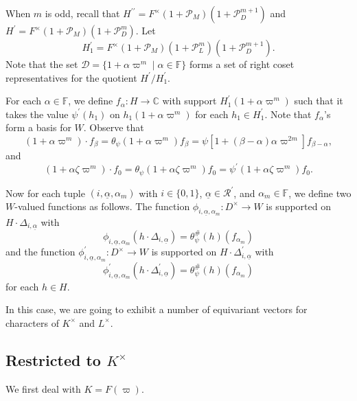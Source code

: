 \documentclass[12pt]{amsart}
\theoremstyle{definition}
\theoremstyle{remark}
\begin{document}
When $m$ is odd, recall that
$H^{\prime \prime} = F^\times (1 +\mathcal P_M) ( 1 + \mathcal P_D^{m+1})$ and $H^\prime = F^\times (1 +\mathcal P_M) ( 1 + \mathcal P_D^m)$. 
Let
\[H_1^\prime = F^\times (1 +\mathcal{P}_M) (1+\mathcal P_L^m)(1 +\mathcal{P}_D^{m+1}).\] 
Note that the set $\mathcal{D} = \{1+ \alpha \varpi^m \mid \alpha \in \mathbb F\}$ forms a set of right coset representatives for the quotient $H^\prime/H_1^\prime$. 

For each $\alpha \in \mathbb F$, we define $f_\alpha: H \rightarrow \mathbb C$ with support $H_1^\prime (1 + \alpha \varpi^m)$ such that it takes the value $\psi^\prime(h_1)$ on $h_1(1 + \alpha \varpi^m)$ for each $h_1 \in H_1^\prime$. Note that $f_\alpha$'s form a basis for $W$. Observe that  
\begin{equation}\label{action1}
(1 + \alpha \varpi^m) \cdot f_\beta = \theta_\psi(1 + \alpha \varpi^m) f_\beta = \psi[1 +(\beta-\alpha)\alpha \varpi^{2m}] f_{\beta-\alpha},
\end{equation}
and 
\begin{equation}\label{action2}
(1 + \alpha \zeta \varpi^m) \cdot f_0 = \theta_\psi(1 + \alpha \zeta \varpi^m) f_0 = \psi^\prime(1 + \alpha \zeta \varpi^m) f_0.
\end{equation}

Now for each tuple $(i, \underline{\alpha}, \alpha_m)$ with $i \in \{0,1\}$, $\underline{\alpha} \in \mathcal{R}^\prime$,  and $\alpha_m \in \mathbb F$, we define two $W$-valued functions as follows. The function
$\phi_{i,\underline{\alpha},\alpha_m}: D^\times \rightarrow W$  is supported on $H \cdot \Delta_{i,\underline{\alpha}}$ with \[\phi_{i,\underline{\alpha},\alpha_m}(h \cdot \Delta_{i,\underline{\alpha}})= \theta_\psi^\#(h)(f_{\alpha_m})\]
and the function $\phi_{i,\underline{\alpha},\alpha_m}^\prime: D^\times \rightarrow W$ is supported on $H \cdot \Delta_{i,\underline{\alpha}}^\prime $ with 
\[\phi_{i,\underline{\alpha},\alpha_m}^\prime (h \cdot \Delta_{i,\underline{\alpha}}^\prime)= \theta_\psi^\#(h)(f_{\alpha_m})\]
for each $h \in H$.

In this case, we are going to exhibit a number of equivariant vectors for characters of $K^\times$ and $L^\times$. 

\subsection{Restricted to $K^\times$}

We first deal with $K = F(\varpi)$. 
\end{document}
